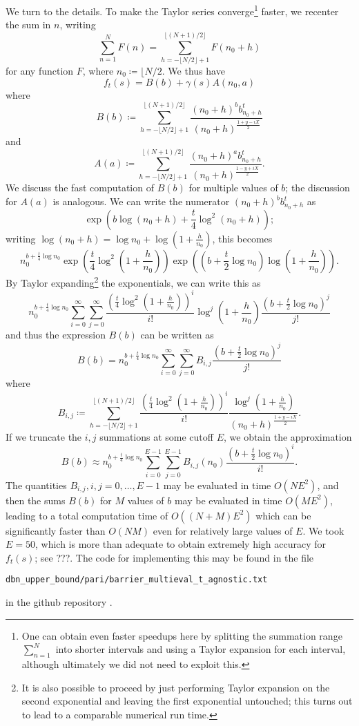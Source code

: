We turn to the details.  To make the Taylor series converge\footnote{One can obtain even faster speedups here by splitting the summation range $\sum_{n=1}^N$ into shorter intervals and using a Taylor expansion for each interval, although ultimately we did not need to exploit this.} faster, we recenter the sum in $n$, writing
$$ \sum_{n=1}^N F(n) = \sum_{h=-\lfloor N/2\rfloor+1}^{\lfloor (N+1)/2\rfloor} F(n_0 + h)$$
for any function $F$, where $n_0 \coloneqq \lfloor N/2$.  We thus have
$$ f_t(s) = B(b) + \gamma(s) A(n_0,a)$$
where
$$ B(b) \coloneqq \sum_{h=-\lfloor N/2\rfloor+1}^{\lfloor (N+1)/2\rfloor} \frac{(n_0+h)^b b_{n_0+h}^t}{(n_0+h)^{\frac{1+y-iX}{2}}}$$
and
$$ A(a) \coloneqq \sum_{h=-\lfloor N/2\rfloor+1}^{\lfloor (N+1)/2\rfloor} \frac{(n_0+h)^a b_{n_0+h}^t}{(n_0+h)^{\frac{1-y+iX}{2}}}.$$
We discuss the fast computation of $B(b)$ for multiple values of $b$; the discussion for $A(a)$ is analogous.  We can write the numerator $(n_0+h)^b b_{n_0+h}^t$ as
$$ \exp( b \log(n_0+h) + \frac{t}{4} \log^2(n_0+h) );$$
writing $\log(n_0+h) = \log n_0 + \log(1+\frac{h}{n_0})$, this becomes
$$ n_0^{b + \frac{t}{4} \log n_0} \exp( \frac{t}{4} \log^2(1+\frac{h}{n_0}) ) \exp( (b + \frac{t}{2} \log n_0) \log(1+\frac{h}{n_0}) ).$$
By Taylor expanding\footnote{It is also possible to proceed by just performing Taylor expansion on the second exponential and leaving the first exponential untouched; this turns out to lead to a comparable numerical run time.} the exponentials, we can write this as
$$ n_0^{b + \frac{t}{4} \log n_0} \sum_{i=0}^\infty \sum_{j=0}^\infty \frac{( \frac{t}{4} \log^2(1+\frac{h}{n_0}) )^i}{i!} \log^j(1+\frac{h}{n_0}) \frac{(b+\frac{t}{2} \log n_0)^j}{j!}$$
and thus the expression $B(b)$ can be written as
$$ B(b) = n_0^{b + \frac{t}{4} \log n_0} \sum_{i=0}^\infty \sum_{j=0}^\infty B_{i,j} \frac{(b+\frac{t}{2} \log n_0)^j}{j!}$$
where
$$ B_{i,j} \coloneqq \sum_{h=-\lfloor N/2\rfloor+1}^{\lfloor (N+1)/2\rfloor} \frac{( \frac{t}{4} \log^2(1+\frac{h}{n_0}) )^i}{i!} \frac{\log^j(1+\frac{h}{n_0})}{(n_0+h)^{\frac{1+y-iX}{2}}}.$$
If we truncate the $i,j$ summations at some cutoff $E$, we obtain the approximation
$$ B(b) \approx n_0^{b + \frac{t}{4} \log n_0} \sum_{i=0}^{E-1} \sum_{j=0}^{E-1} B_{i,j}(n_0) \frac{(b+\frac{t}{2} \log n_0)^i}{i!}.$$
The quantities $B_{i,j}, i,j=0,\dots,{E-1}$ may be evaluated in time $O(N E^2)$, and then the sums $B(b)$ for $M$ values of $b$ may be evaluated in time $O(ME^2)$, leading to a total computation time of $O((N+M) E^2)$ which can be significantly faster than $O(NM)$ even for relatively large values of $E$.  We took $E=50$, which is more than adequate to obtain extremely high accuracy for $f_t(s)$; see ???.  The code for implementing this may be found in the file

\centerline{\tt dbn\_upper\_bound/pari/barrier\_multieval\_t\_agnostic.txt}

in the github repository \cite{github}.

